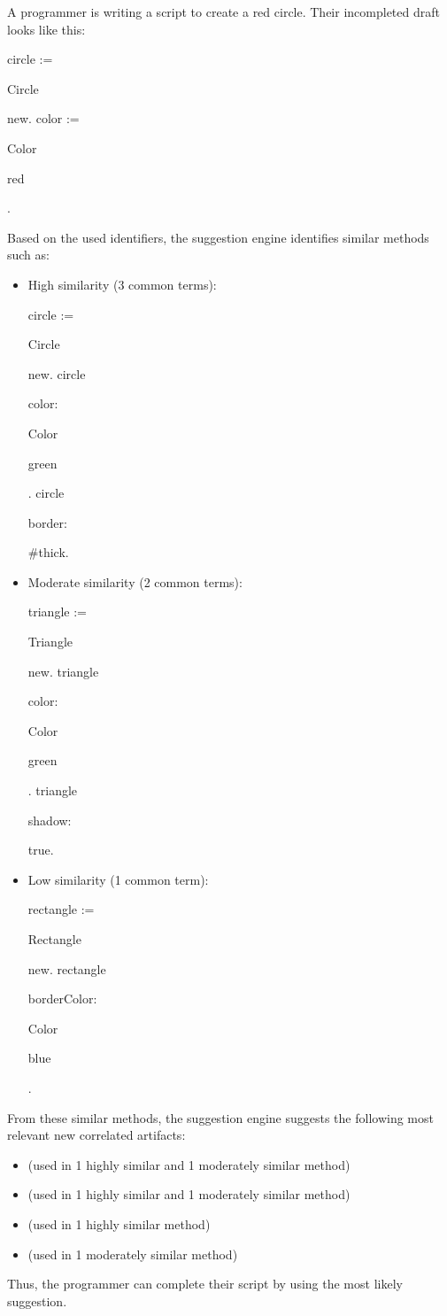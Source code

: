 \begin{example}
	A programmer is writing a script to create a red circle.
	Their incompleted draft looks like this:
	\newcommand*\interm[1]{\setlength{\fboxsep}{0pt}\colorbox{intermbasecolor!30}{\strut{}#1}}
	\newcommand*\coterm[1]{\setlength{\fboxsep}{0pt}\colorbox{red!30}{\strut{}#1}}
	\let\oldmulticode\multicode \let\endoldmulticode\endmulticode
	\RenewDocumentEnvironment{multicode}{}{\setlength{\baselineskip}{1em}\oldmulticode}{\endoldmulticode}
	\begin{multicode}
		circle := \interm{Circle} new. \n
		color := \interm{Color} \interm{red}.
	\end{multicode}
	Based on the used identifiers, the suggestion engine identifies similar methods such as:
	\begin{itemize}
		\item High similarity (3 common terms):
		\begin{multicode}
			circle := \interm{Circle} new. \n
			circle \coterm{color:} \interm{Color} \coterm{green}. \n
			circle \coterm{border:} \#thick.
		\end{multicode}
		\item Moderate similarity (2 common terms):
		\begin{multicode}
			triangle := \coterm{Triangle} new. \n
			triangle \coterm{color:} \interm{Color} \coterm{green}. \n
			triangle \coterm{shadow:} true.
		\end{multicode}
		\item Low similarity (1 common term):
		\begin{multicode}
			rectangle := \coterm{Rectangle} new. \n
			rectangle \coterm{borderColor:} \interm{Color} \coterm{blue}.
		\end{multicode}
	\end{itemize}
	From these similar methods, the suggestion engine suggests the following most relevant new correlated artifacts:
	\begin{itemize}
		\item {} (used in 1 highly similar and 1 moderately similar
		method)
		\item {} (used in 1 highly similar and 1 moderately similar
		method)
		\item {} (used in 1 highly similar method)
		\item {} (used in 1 moderately similar method)
	\end{itemize}
	Thus, the programmer can complete their script by using the most likely suggestion.
\end{example}
